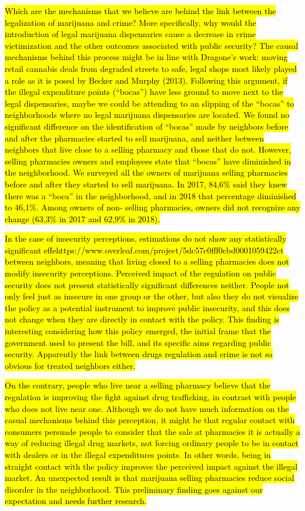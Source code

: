 \documentclass[11pt]{article}
\begin{document}
\hl{Which are the mechanisms that we believe are behind the link between the legalization of marijuana and crime? More specifically, why would the introduction of legal marijuana dispensaries cause a decrease in crime victimization and the other outcomes associated with public security? The causal mechanisms behind this process might be in line with Dragone's work: moving retail cannabis deals from degraded streets to safe, legal shops most likely played a role as it is posed by Becker and Murphy (2013). Following this argument, if the illegal expenditure points (``bocas'') have less ground to move next to the legal dispensaries, maybe we could be attending to an slipping of the ``bocas'' to neighborhoods where no legal marijuana dispensaries are located. We found no significant difference on the identification of ``bocas'' made by neighbors before and after the pharmacies started to sell marijuana, and neither between neighbors that live close to a selling pharmacy and those that do not. However, selling pharmacies owners and employees state that ``bocas'' have diminished in the neighborhood. We surveyed all the owners of marijuana selling pharmacies before and after they started to sell marijuana. In 2017, 84,6\% said they knew there was a ``boca'' in the neighborhood, and in 2018 that percentage diminished to 46,1\%. Among owners of non- selling pharmacies, owners did not recognize any change (63,3\% in 2017 and 62,9\% in 2018).}

\hl{In the case of insecurity perceptions, estimations do not show any statistically significant effehttps://www.overleaf.com/project/5dc57c0fff0cbd0001059422ct between neighbors, meaning that living closed to a selling pharmacies does not modify insecurity perceptions. Perceived impact of the regulation on public security does not present statistically significant differences neither. People not only feel just as insecure in one group or the other, but also they do not visualize the policy as a potential instrument to improve public insecurity, and this does not change when they are directly in contact with the policy. This finding is interesting considering how this policy emerged, the initial frame that the government used to present the bill, and its specific aims regarding public security. Apparently the link between drugs regulation and crime is not so obvious for treated neighbors either.}

\hl{On the contrary, people who live near a selling pharmacy believe that the regulation is improving the fight against drug trafficking, in contrast with people who does not live near one. Although we do not have much information on the casual mechanisms behind this perception, it might be that regular contact with consumers persuade people to consider that the sale at pharmacies it is actually a way of reducing illegal drug markets, not forcing ordinary people to be in contact with dealers or in the illegal expenditures points. In other words, being in straight contact with the policy improves the perceived impact against the illegal market. An unexpected result is that marijuana selling pharmacies reduce social disorder in the neighborhood. This preliminary finding goes against our expectation and needs further research.}
\end{document}
